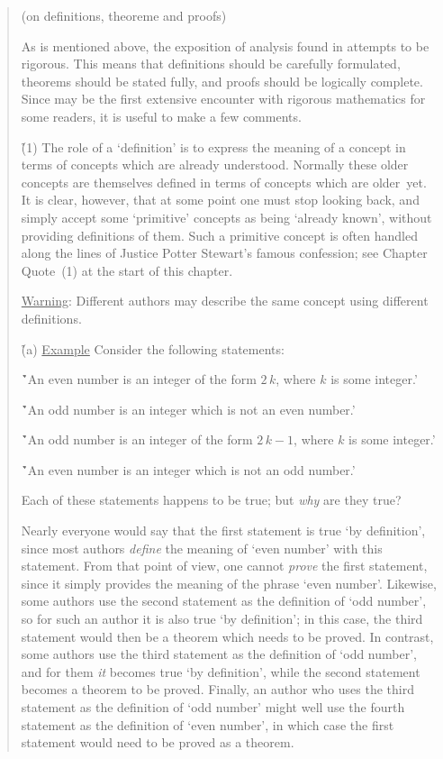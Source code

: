 \begin{quotation}
{\footnotesize \underline{\Note} (on definitions, theoreme and proofs)

\V

        As is mentioned above, the exposition of analysis found in {\TheseNotes} attempts to be rigorous.
    This means that definitions should be carefully formulated, theorems should be stated fully, and proofs should be logically complete.
    Since {\TheseNotes} may be the first extensive encounter with rigorous mathematics for some readers,
    it is useful to make a few comments.

\V

      \h \h (1) The role of a `definition' is to express the meaning of a concept in terms of concepts which are already understood.
    Normally these older concepts are themselves defined in terms of concepts which are older~yet.
    It is clear, however, that at some point one must stop looking back, and simply accept some `primitive' concepts as being `already known',
    without providing definitions of them.
    Such a primitive concept is often handled along the lines of Justice Potter Stewart's famous confession;
    see Chapter Quote~(1) at the start of this chapter.


        \underline{Warning}: Different authors may describe the same concept using different definitions.

\VA

       \h \h (a) \underline{Example} Consider the following statements:

        \h \h \h `An even number is an integer of the form $2\,k$, where $k$ is some integer.'

        \h \h \h `An odd number is an integer which is not an even number.'

        \h \h \h `An odd number is an integer of the form $2\,k -1$, where $k$ is some integer.'

        \h \h \h `An even number is an integer which is not an odd number.'

\VA

\noindent Each of these statements happens to be true; but {\em why} are they true?

        Nearly everyone would say that the first statement is true `by definition',
    since most authors {\em define} the meaning of `even number' with this statement.
    From that point of view, one cannot {\em prove} the first statement, since it simply provides the meaning of the phrase `even number'.
    Likewise, some authors use the second statement as the definition of `odd number', so for such an author it is also true `by definition';
    in this case, the third statement would then be a theorem which needs to be proved.
    In contrast, some authors use the third statement as the definition of `odd number', and for them {\em it} becomes true `by definition',
    while the second statement becomes a theorem to be proved.
    Finally, an author who uses the third statement as the definition of `odd number' might well use the fourth statement as the definition of `even number', 
    in which case the first statement would need to be proved as a theorem.

}
\end{quotation}

